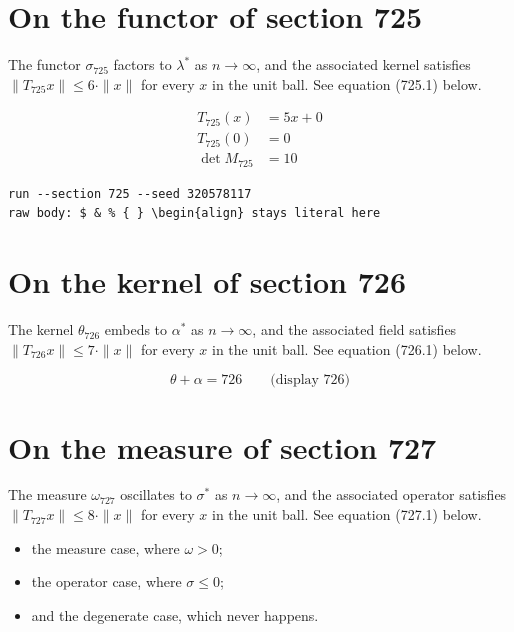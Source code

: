 \documentclass{article}
\begin{document}
\section{On the functor of section 725}
The functor $\sigma_{725}$ factors to $\lambda^{*}$ as $n \to \infty$,
and the associated kernel satisfies $\|T_{725} x\| \leq 6 \cdot \|x\|$
for every $x$ in the unit ball. See equation (725.1) below.

\begin{align}
T_{725}(x) &= 5 x + 0 \\
T_{725}(0) &= 0 \\
\det M_{725} &= 10
\end{align}

\begin{verbatim}
run --section 725 --seed 320578117
raw body: $ & % { } \begin{align} stays literal here
\end{verbatim}

\section{On the kernel of section 726}
The kernel $\theta_{726}$ embeds to $\alpha^{*}$ as $n \to \infty$,
and the associated field satisfies $\|T_{726} x\| \leq 7 \cdot \|x\|$
for every $x$ in the unit ball. See equation (726.1) below.

$$
\theta + \alpha = 726 \qquad \text{(display 726)}
$$

\section{On the measure of section 727}
The measure $\omega_{727}$ oscillates to $\sigma^{*}$ as $n \to \infty$,
and the associated operator satisfies $\|T_{727} x\| \leq 8 \cdot \|x\|$
for every $x$ in the unit ball. See equation (727.1) below.

\begin{itemize}
  \item the measure case, where $\omega > 0$;
  \item the operator case, where $\sigma \leq 0$;
  \item and the degenerate case, which never happens.
\end{itemize}
\end{document}
